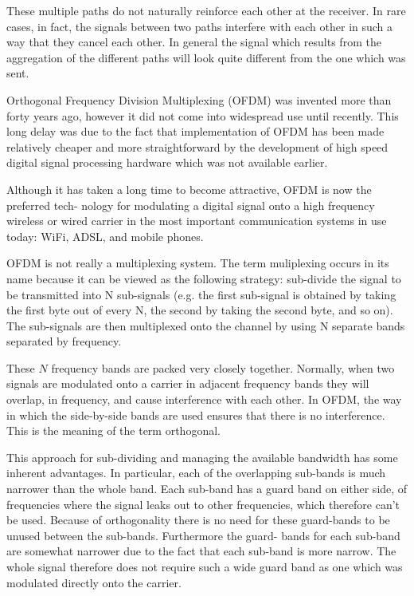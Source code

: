 These multiple paths do not naturally reinforce each other at the receiver. In rare cases, in
fact, the signals between two paths interfere with each other in such a way that they cancel
each other. In general the signal which results from the aggregation of the different paths will
look quite different from the one which was sent.

Orthogonal Frequency Division Multiplexing (OFDM) \cite{LiStuber2006} was invented more than forty
years ago, however it did not come into widespread use until recently. This long delay was
due to the fact that implementation of OFDM has been made relatively cheaper and more
straightforward by the development of high speed digital signal processing hardware which
was not available earlier.

Although it has taken a long time to become attractive, OFDM is now the preferred tech-
nology for modulating a digital signal onto a high frequency wireless or wired carrier in the
most important communication systems in use today: WiFi, ADSL, and mobile phones.

OFDM is not really a multiplexing system. The term muliplexing occurs in its name because
it can be viewed as the following strategy: sub-divide the signal to be transmitted into N
sub-signals (e.g. the first sub-signal is obtained by taking the first byte out of every N, the
second by taking the second byte, and so on). The sub-signals are then multiplexed onto the
channel by using N separate bands separated by frequency.

These $N$ frequency bands are packed very closely together. Normally, when two signals are
modulated onto a carrier in adjacent frequency bands they will overlap, in frequency, and
cause interference with each other. In OFDM, the way in which the side-by-side bands are
used ensures that there is no interference. This is the meaning of the term orthogonal.

This approach for sub-dividing and managing the available bandwidth has some inherent
advantages. In particular, each of the overlapping sub-bands is much narrower than the whole
band. Each sub-band has a guard band on either side, of frequencies where the signal leaks
out to other frequencies, which therefore can’t be used. Because of orthogonality there is
no need for these guard-bands to be unused between the sub-bands. Furthermore the guard-
bands for each sub-band are somewhat narrower due to the fact that each sub-band is more
narrow. The whole signal therefore does not require such a wide guard band as one which
was modulated directly onto the carrier.

